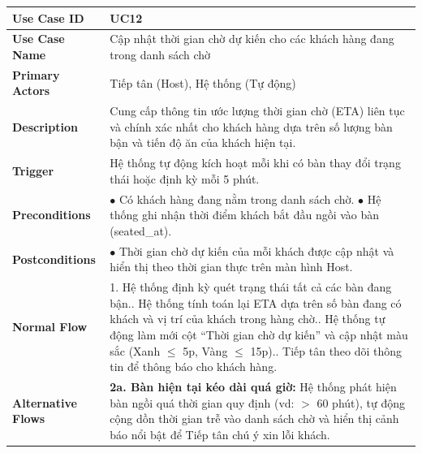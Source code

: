 \begin{longtable}{|p{3.5cm}|p{12.5cm}|}
\hline
\textbf{Use Case ID} & UC12 \\ \hline
\textbf{Use Case Name} & Cập nhật thời gian chờ dự kiến cho các khách hàng đang trong danh sách chờ \\ \hline
\textbf{Primary Actors} & Tiếp tân (Host), Hệ thống (Tự động) \\ \hline
\textbf{Description} & Cung cấp thông tin ước lượng thời gian chờ (ETA) liên tục và chính xác nhất cho khách hàng dựa trên số lượng bàn bận và tiến độ ăn của khách hiện tại. \\ \hline
\textbf{Trigger} & Hệ thống tự động kích hoạt mỗi khi có bàn thay đổi trạng thái hoặc định kỳ mỗi 5 phút. \\ \hline
\textbf{Preconditions} &
$\bullet$ Có khách hàng đang nằm trong danh sách chờ.\newline
$\bullet$ Hệ thống ghi nhận thời điểm khách bắt đầu ngồi vào bàn (seated\_at). \\ \hline
\textbf{Postconditions} & $\bullet$ Thời gian chờ dự kiến của mỗi khách được cập nhật và hiển thị theo thời gian thực trên màn hình Host. \\ \hline
\textbf{Normal Flow} &
1. Hệ thống định kỳ quét trạng thái tất cả các bàn đang bận.\newline
2. Hệ thống tính toán lại ETA dựa trên số bàn đang có khách và vị trí của khách trong hàng chờ.\newline
3. Hệ thống tự động làm mới cột ``Thời gian chờ dự kiến'' và cập nhật màu sắc (Xanh $\le$ 5p, Vàng $\le$ 15p).\newline
4. Tiếp tân theo dõi thông tin để thông báo cho khách hàng. \\ \hline
\textbf{Alternative Flows} &
\textbf{2a. Bàn hiện tại kéo dài quá giờ:} Hệ thống phát hiện bàn ngồi quá thời gian quy định (vd: $>$ 60 phút), tự động cộng dồn thời gian trễ vào danh sách chờ và hiển thị cảnh báo nổi bật để Tiếp tân chú ý xin lỗi khách. \\ \hline
\end{longtable}


